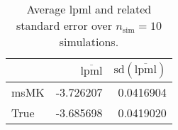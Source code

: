 \begin{table}[H]

\caption{Average lpml and related standard error over $n_{\text{sim}} = 10$ simulations.}
\centering
\begin{tabular}[t]{lrr}
\toprule
  & $\overbar{\text{lpml}}$ & $\text{sd}(\overbar{\text{lpml}})$\\
\midrule
msMK & -3.726207 & 0.0416904\\
True & -3.685698 & 0.0419020\\
\bottomrule
\end{tabular}
\end{table}